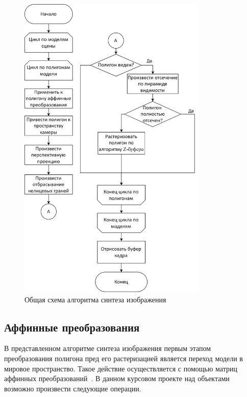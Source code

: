 \begin{figure}[h]
	\centering
	\includegraphics[width=0.8\textwidth]{img/alg_scene.png}
	\caption{Общая схема алгоритма синтеза изображения}
	\label{fig:alg_scene}
\end{figure}

\clearpage

\subsection{Аффинные преобразования}

В представленном алгоритме синтеза изображения первым этапом преобразования полигона пред его растеризацией является переход модели в мировое пространство. 
Такое действие осуществляется с помощью матриц аффинных преобразований~\cite{porevcg}.
В данном курсовом проекте над объектами возможно произвести следующие операции.

